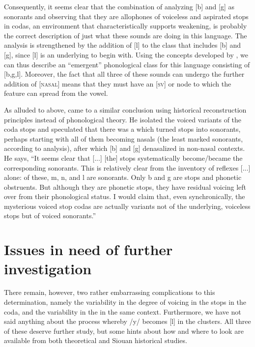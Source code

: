 \documentclass[output=paper]{LSP/langsci}
\begin{document}
Consequently, it seems clear that the combination of analyzing [b] and [g] as sonorants and observing that they are allophones of voiceless and aspirated stops in codas, an environment that characteristically supports weakening, is probably the correct description of just what these sounds are doing in this language. The analysis is strengthened by the addition of [l] to the class that includes [b] and [g], since [l] is an underlying  to begin with. Using the concepts developed by \citet{Mielke2008}, we can thus describe an ``emergent'' phonological class for this language consisting of [b,g,l]. Moreover, the fact that all three of these sounds can undergo the further addition of [\textsc{nasal}] means that they must have an [\textsc{sv}] or  node to which the feature can spread from the vowel.

As alluded to above, \citet[5]{Rankin2001} came to a similar conclusion using historical reconstruction principles instead of phonological theory. He isolated the voiced variants of the coda stops and speculated that there was a  which turned stops into sonorants, perhaps starting with all of them becoming nasals (the least marked sonorants, according to  analysis), after which [b] and [g] denasalized in non-nasal contexts. He says, ``It seems clear that [...] [the] stops systematically become/became the corresponding sonorants. This is relatively clear from the inventory of reflexes [...] alone: of these, m, n,  and l are sonorants. Only b and g are stops and phonetic obstruents. But although they are phonetic stops, they have residual voicing left over from their  phonological status. I would claim that, even synchronically, the mysterious voiced stop codas are actually variants not of the underlying, voiceless stops but of voiced sonorants.''

\section{Issues in need of further investigation}

There remain, however, two rather embarrassing complications to this determination, namely the variability in the degree of voicing in the stops in the coda, and the variability in the  in the same context. Furthermore, we have not said anything about the process whereby /y/ becomes [l] in the  clusters. All three of these deserve further study, but some hints about how and where to look are available from both theoretical  and Siouan historical studies.
\end{document}
